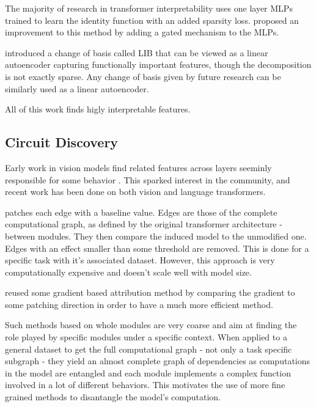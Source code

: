 \documentclass{article}
\begin{document}
The majority of research in transformer interpretability uses one layer MLPs \citep{cunningham2023sparse, gao2024scaling} trained to learn the identity function with an added sparsity loss. \citet{rajamanoharan2024improving} proposed an improvement to this method by adding a gated mechanism to the MLPs.

\citet{bushnaq2024using} introduced a change of basis called LIB that can be viewed as a linear autoencoder capturing functionally important features, though the decomposition is not exactly sparse. Any change of basis given by future research can be similarly used as a linear autoencoder.%

All of this work finds higly interpretable features.

\subsection{Circuit Discovery}

Early work in vision models find related features across layers seeminly responsible for some behavior \citep{olah2020zoomCircuits}. This sparked interest in the community, and recent work has been done on both vision and language transformers.

\citet{conmy2023automatedACDCCircuits} patches each edge with a baseline value. Edges are those of the complete computational graph, as defined by the original transformer architecture - between modules. They then compare the induced model to the unmodified one. Edges with an effect smaller than some threshold are removed. This is done for a specific task with it's associated dataset. However, this approach is very computationally expensive and doesn't scale well with model size.

\citet{syed2023attributionCircuits} reused some gradient based attribution method by comparing the gradient to some patching direction in order to have a much more efficient method.

Such methods based on whole modules are very coarse and aim at finding the role played by specific modules under a specific context. When applied to a general dataset to get the full computational graph - not only a task specific subgraph - they yield an almost complete graph of dependencies as computations in the model are entangled and each module implements a complex function involved in a lot of different behaviors. This motivates the use of more fine grained methods to disantangle the model's computation.
\end{document}
